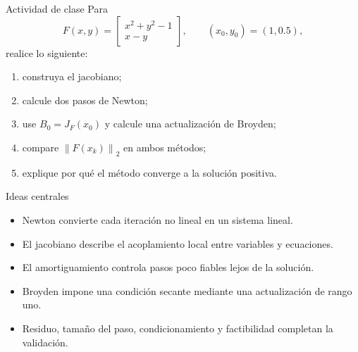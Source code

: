 \documentclass[aspectratio=169,12pt]{beamer}
\newcommand{\mat}[1]{\begin{bmatrix}#1\end{bmatrix}}
\newcommand{\norm}[1]{\left\lVert#1\right\rVert}
\begin{document}
\begin{frame}{Actividad de clase}
Para
\[
F(x,y)=\mat{x^2+y^2-1\\x-y},
\qquad (x_0,y_0)=(1,0.5),
\]
realice lo siguiente:
\begin{enumerate}
  \item construya el jacobiano;
  \item calcule dos pasos de Newton;
  \item use $B_0=J_F(x_0)$ y calcule una actualización de Broyden;
  \item compare $\norm{F(x_k)}_2$ en ambos métodos;
  \item explique por qué el método converge a la solución positiva.
\end{enumerate}
\end{frame}

\begin{frame}{Ideas centrales}
\begin{itemize}
  \item Newton convierte cada iteración no lineal en un sistema lineal.
  \item El jacobiano describe el acoplamiento local entre variables y ecuaciones.
  \item El amortiguamiento controla pasos poco fiables lejos de la solución.
  \item Broyden impone una condición secante mediante una actualización de rango uno.
  \item Residuo, tamaño del paso, condicionamiento y factibilidad completan la validación.
\end{itemize}
\end{frame}
\end{document}
